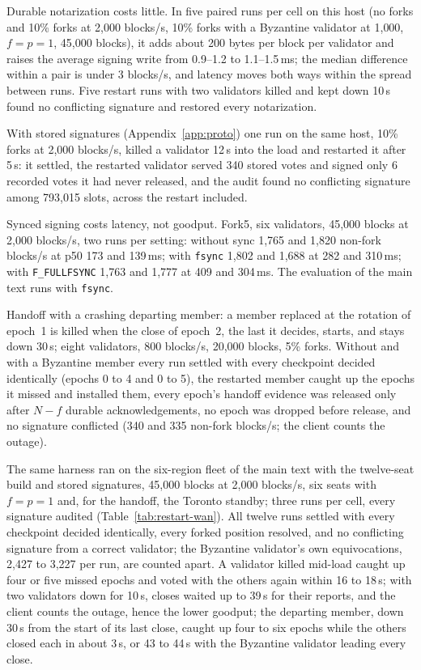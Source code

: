 \documentclass[conference]{IEEEtran}
\begin{document}
Durable notarization costs little. In five paired runs per cell on this host (no forks and 10\% forks at 2{,}000 blocks/s, 10\% forks with a Byzantine validator at 1{,}000, $f=p=1$, 45{,}000 blocks), it adds about 200 bytes per block per validator and raises the average signing write from 0.9--1.2 to 1.1--1.5\,ms; the median difference within a pair is under 3 blocks/s, and latency moves both ways within the spread between runs. Five restart runs with two validators killed and kept down 10\,s found no conflicting signature and restored every notarization.

With stored signatures (Appendix~\ref{app:proto}) one run on the same host, 10\% forks at 2{,}000 blocks/s, killed a validator 12\,s into the load and restarted it after 5\,s: it settled, the restarted validator served 340 stored votes and signed only 6 recorded votes it had never released, and the audit found no conflicting signature among 793{,}015 slots, across the restart included.

Synced signing costs latency, not goodput. Fork5, six validators, 45{,}000 blocks at 2{,}000 blocks/s, two runs per setting: without sync 1{,}765 and 1{,}820 non-fork blocks/s at p50 173 and 139\,ms; with \texttt{fsync} 1{,}802 and 1{,}688 at 282 and 310\,ms; with \texttt{F\_FULLFSYNC} 1{,}763 and 1{,}777 at 409 and 304\,ms. The evaluation of the main text runs with \texttt{fsync}.

Handoff with a crashing departing member: a member replaced at the rotation of epoch~1 is killed when the close of epoch~2, the last it decides, starts, and stays down 30\,s; eight validators, 800 blocks/s, 20{,}000 blocks, 5\% forks. Without and with a Byzantine member every run settled with every checkpoint decided identically (epochs 0 to 4 and 0 to 5), the restarted member caught up the epochs it missed and installed them, every epoch's handoff evidence was released only after $N-f$ durable acknowledgements, no epoch was dropped before release, and no signature conflicted (340 and 335 non-fork blocks/s; the client counts the outage).

 The same harness ran on the six-region fleet of the main text with the twelve-seat build and stored signatures, 45{,}000 blocks at 2{,}000 blocks/s, six seats with $f=p=1$ and, for the handoff, the Toronto standby; three runs per cell, every signature audited (Table~\ref{tab:restart-wan}). All twelve runs settled with every checkpoint decided identically, every forked position resolved, and no conflicting signature from a correct validator; the Byzantine validator's own equivocations, 2{,}427 to 3{,}227 per run, are counted apart. A validator killed mid-load caught up four or five missed epochs and voted with the others again within 16 to 18\,s; with two validators down for 10\,s, closes waited up to 39\,s for their reports, and the client counts the outage, hence the lower goodput; the departing member, down 30\,s from the start of its last close, caught up four to six epochs while the others closed each in about 3\,s, or 43 to 44\,s with the Byzantine validator leading every close.
\end{document}
